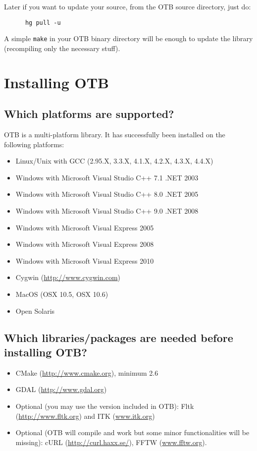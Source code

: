 Later if you want to update your source, from the OTB source directory, just do:
\begin{verbatim}
      hg pull -u
\end{verbatim}

A simple \texttt{make} in your OTB binary directory will be enough to update the library (recompiling only the necessary stuff).


\section{Installing OTB}
\label{sec:FAQInstall}
\subsection{Which platforms are supported?}
OTB is a multi-platform library. It has successfully been installed on
the following platforms:
\begin{itemize}
  \item Linux/Unix with GCC (2.95.X, 3.3.X, 4.1.X, 4.2.X, 4.3.X, 4.4.X)
  \item Windows with Microsoft Visual Studio C++ 7.1 .NET 2003
  \item Windows with Microsoft Visual Studio C++ 8.0 .NET 2005
  \item Windows with Microsoft Visual Studio C++ 9.0 .NET 2008
  \item Windows with Microsoft Visual Express 2005
  \item Windows with Microsoft Visual Express 2008
  \item Windows with Microsoft Visual Express 2010
  \item Cygwin (\url{http://www.cygwin.com})
  \item MacOS (OSX 10.5, OSX 10.6)
  \item Open Solaris
\end{itemize}

\subsection{Which libraries/packages are needed before installing
 OTB?}
\begin{itemize}
\item CMake (\url{http://www.cmake.org}), minimum 2.6
\item GDAL (\url{http://www.gdal.org})
\item Optional (you may use the version included in OTB): Fltk (\url{http://www.fltk.org}) and ITK (\url{www.itk.org})
\item Optional (OTB will compile and work but some minor functionalities will be missing): cURL (\url{http://curl.haxx.se/}), FFTW (\url{www.fftw.org}).
\end{itemize}

